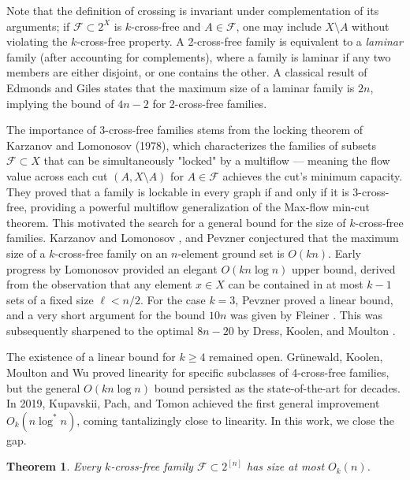 \documentclass[11pt]{article}
\newtheorem{theorem}{Theorem}[section]
\theoremstyle{definition}
\newcommand{\cF}{\mathcal{F}}
\begin{document}
Note that the definition of crossing is invariant under complementation of its arguments; if $\cF\subset 2^X$ is $k$-cross-free and $A\in \cF$,  one may include $X\setminus A$  without violating the $k$-cross-free property.  A 2-cross-free family is equivalent to a \emph{laminar} family (after accounting for complements), where a family is laminar if any two members are either disjoint, or one contains the other. A classical result of Edmonds and Giles \cite{EG} states that the maximum size of a laminar family is $2n$, implying the bound of $4n-2$ for 2-cross-free families.

The importance of 3-cross-free families stems from the locking theorem of Karzanov and Lomonosov \cite{KL} (1978), which characterizes the families of subsets $\mathcal{F} \subset X$ that can be simultaneously "locked" by a multiflow --- meaning the flow value across each cut $(A, X \setminus A)$ for $A \in \mathcal{F}$ achieves the cut's minimum capacity. They proved that a family is lockable in every graph if and only if it is 3-cross-free, providing a powerful multiflow generalization of the Max-flow min-cut theorem. This motivated the search for a general bound for the size of $k$-cross-free families. Karzanov and Lomonosov \cite{Karzanov,KL}, and Pevzner \cite{Pevzner} conjectured that the maximum size of a $k$-cross-free family on an $n$-element ground set is $O(kn)$. Early progress by Lomonosov provided an elegant $O(kn\log n)$ upper bound, derived from the observation that any element $x \in X$ can be contained in at most $k-1$ sets of a fixed size $\ell < n/2$.  For the case $k=3$, Pevzner \cite{Pevzner} proved a linear bound, and a very short argument for the bound $10n$ was given by Fleiner \cite{Fleiner}. This was subsequently sharpened to the optimal $8n-20$ by Dress, Koolen, and Moulton \cite{DKM}.

The existence of a linear bound for $k \geq 4$ remained open. Gr\"unewald, Koolen, Moulton and Wu \cite{GKMW} proved linearity for specific subclasses of 4-cross-free families, but the general $O(kn \log n)$ bound persisted as the state-of-the-art for decades. In 2019, Kupavskii, Pach, and Tomon \cite{KPT} achieved the first general improvement $O_k(n\log^* n)$, coming tantalizingly close to linearity. In this work, we close the gap.

\begin{theorem}\label{thm:main0}
    Every $k$-cross-free family $\cF\subset 2^{[n]}$ has size at most $O_k(n)$.
\end{theorem}
\end{document}
